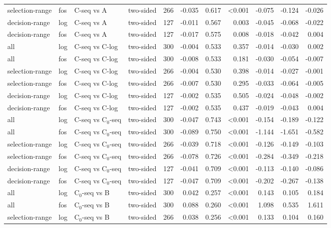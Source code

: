 \begin{longtable}{llllrrrrrrr}
selection-range & fos & C-seq vs A & two-sided & 266 & -0.035 & 0.617 & <0.001 & -0.075 & -0.124 & -0.026 \\
decision-range & log & C-seq vs A & two-sided & 127 & -0.011 & 0.567 & 0.003 & -0.045 & -0.068 & -0.022 \\
decision-range & fos & C-seq vs A & two-sided & 127 & -0.017 & 0.575 & 0.008 & -0.018 & -0.042 & 0.004 \\
all & log & C-seq vs C-log & two-sided & 300 & -0.004 & 0.533 & 0.357 & -0.014 & -0.030 & 0.002 \\
all & fos & C-seq vs C-log & two-sided & 300 & -0.008 & 0.533 & 0.181 & -0.030 & -0.054 & -0.007 \\
selection-range & log & C-seq vs C-log & two-sided & 266 & -0.004 & 0.530 & 0.398 & -0.014 & -0.027 & -0.001 \\
selection-range & fos & C-seq vs C-log & two-sided & 266 & -0.007 & 0.530 & 0.295 & -0.033 & -0.064 & -0.005 \\
decision-range & log & C-seq vs C-log & two-sided & 127 & -0.002 & 0.535 & 0.505 & -0.024 & -0.048 & -0.002 \\
decision-range & fos & C-seq vs C-log & two-sided & 127 & -0.002 & 0.535 & 0.437 & -0.019 & -0.043 & 0.004 \\
all & log & C-seq vs C$_0$-seq & two-sided & 300 & -0.047 & 0.743 & <0.001 & -0.154 & -0.189 & -0.122 \\
all & fos & C-seq vs C$_0$-seq & two-sided & 300 & -0.089 & 0.750 & <0.001 & -1.144 & -1.651 & -0.582 \\
selection-range & log & C-seq vs C$_0$-seq & two-sided & 266 & -0.039 & 0.718 & <0.001 & -0.126 & -0.149 & -0.103 \\
selection-range & fos & C-seq vs C$_0$-seq & two-sided & 266 & -0.078 & 0.726 & <0.001 & -0.284 & -0.349 & -0.218 \\
decision-range & log & C-seq vs C$_0$-seq & two-sided & 127 & -0.041 & 0.709 & <0.001 & -0.113 & -0.140 & -0.086 \\
decision-range & fos & C-seq vs C$_0$-seq & two-sided & 127 & -0.047 & 0.709 & <0.001 & -0.202 & -0.267 & -0.138 \\
all & log & C$_0$-seq vs B & two-sided & 300 & 0.042 & 0.257 & <0.001 & 0.143 & 0.105 & 0.184 \\
all & fos & C$_0$-seq vs B & two-sided & 300 & 0.088 & 0.260 & <0.001 & 1.098 & 0.535 & 1.611 \\
selection-range & log & C$_0$-seq vs B & two-sided & 266 & 0.038 & 0.256 & <0.001 & 0.133 & 0.104 & 0.160 \\

\end{longtable}
